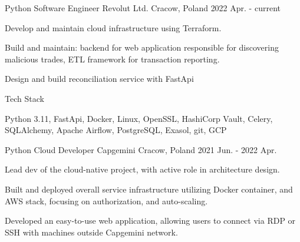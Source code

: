 

\begin{cventries}

  \cventry
    {Python Software Engineer} %
    {Revolut Ltd.} %
    {Cracow, Poland} %
    {2022 Apr. - current} %
    {
      \begin{cvitems} %
        \item {Develop and maintain cloud infrastructure using Terraform.}
        \item {Build and maintain: backend for web application responsible for discovering malicious trades, ETL framework for transaction reporting.}
        \item {Design and build reconciliation service with FastApi}
      \end{cvitems}
    }

  \cventry
    {Tech Stack} %
    {}
    {}
    {}
    {
      \begin{cvitems}
        \item {Python 3.11, FastApi, Docker, Linux, OpenSSL, HashiCorp Vault, Celery, SQLAlchemy, Apache Airflow, PostgreSQL, Exasol, git, GCP}
      \end{cvitems}
    }

  \cventry
    {Python Cloud Developer} %
    {Capgemini} %
    {Cracow, Poland} %
    {2021 Jun. - 2022 Apr.} %
    {
      \begin{cvitems} %
        \item {Lead dev of the cloud-native project, with active role in architecture design.}
        \item {Built and deployed overall service infrastructure utilizing Docker container, and AWS stack, focusing on authorization, and auto-scaling.}
        \item {Developed an easy-to-use web application, allowing users to connect via RDP or SSH with machines outside Capgemini network.}
      \end{cvitems}
    }


\end{cventries}
